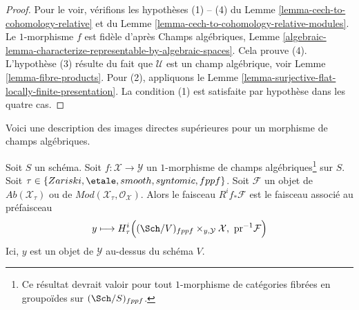 \begin{proof}
Pour le voir, vérifions les hypothèses (1) -- (4) du
Lemme \ref{lemma-cech-to-cohomology-relative} et du
Lemme \ref{lemma-cech-to-cohomology-relative-modules}.
Le $1$-morphisme $f$ est fidèle d'après
Champs algébriques, Lemme
\ref{algebraic-lemma-characterize-representable-by-algebraic-spaces}.
Cela prouve (4).
L'hypothèse (3) résulte du fait que $\mathcal{U}$ est un champ
algébrique, voir
Lemme \ref{lemma-fibre-products}.
Pour (2), appliquons le
Lemme \ref{lemma-surjective-flat-locally-finite-presentation}.
La condition (1) est satisfaite par hypothèse dans les quatre cas.
\end{proof}

\noindent
Voici une description des images directes supérieures pour un
morphisme de champs algébriques.

\begin{lemma}
\label{lemma-pushforward-restriction}
Soit $S$ un schéma. Soit $f : \mathcal{X} \to \mathcal{Y}$ un
$1$-morphisme de champs algébriques\footnote{Ce résultat devrait valoir
pour tout $1$-morphisme de catégories fibrées en groupoïdes sur
$(\Sch/S)_{fppf}$.} sur $S$.
Soit $\tau \in \{Zariski,\linebreak[0] \etale,\linebreak[0]
smooth,\linebreak[0] syntomic,\linebreak[0] fppf\}$.
Soit $\mathcal{F}$
un objet de $\textit{Ab}(\mathcal{X}_\tau)$ ou de
$\textit{Mod}(\mathcal{X}_\tau, \mathcal{O}_\mathcal{X})$.
Alors le faisceau $R^if_*\mathcal{F}$ est le faisceau associé au
préfaisceau
$$
y \longmapsto
H^i_\tau\Big((\Sch/V)_{fppf} \times_{y, \mathcal{Y}} \mathcal{X},
\ \text{pr}^{-1}\mathcal{F}\Big)
$$
Ici, $y$ est un objet de $\mathcal{Y}$ au-dessus du schéma $V$.
\end{lemma}

